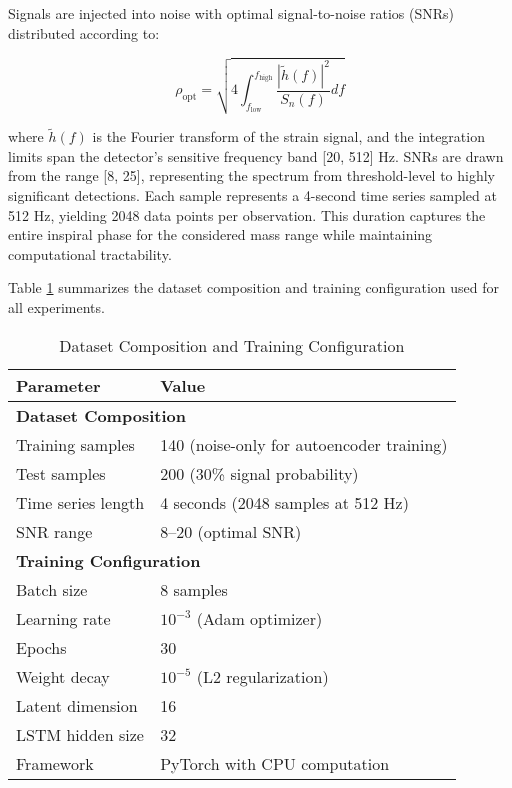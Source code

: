 \documentclass{iopjournal}
\begin{document}
Signals are injected into noise with optimal signal-to-noise ratios (SNRs) distributed according to:

\begin{equation}
\rho_{\text{opt}} = \sqrt{4 \int_{f_{\text{low}}}^{f_{\text{high}}} \frac{|\tilde{h}(f)|^2}{S_n(f)} df}
\end{equation}

where $\tilde{h}(f)$ is the Fourier transform of the strain signal, and the integration limits span the detector's sensitive frequency band [20, 512] Hz. SNRs are drawn from the range [8, 25], representing the spectrum from threshold-level to highly significant detections. Each sample represents a 4-second time series sampled at 512 Hz, yielding 2048 data points per observation. This duration captures the entire inspiral phase for the considered mass range while maintaining computational tractability.

Table \ref{tab:dataset} summarizes the dataset composition and training configuration used for all experiments.

\begin{table}[htbp]
\centering
\caption{Dataset Composition and Training Configuration}
\label{tab:dataset}
\begin{tabular}{ll}
\hline
\textbf{Parameter} & \textbf{Value} \\
\hline
\multicolumn{2}{l}{\textbf{Dataset Composition}} \\
Training samples & 140 (noise-only for autoencoder training) \\
Test samples & 200 (30\% signal probability) \\
Time series length & 4 seconds (2048 samples at 512 Hz) \\
SNR range & 8--20 (optimal SNR) \\
\hline
\multicolumn{2}{l}{\textbf{Training Configuration}} \\
Batch size & 8 samples \\
Learning rate & $10^{-3}$ (Adam optimizer) \\
Epochs & 30 \\
Weight decay & $10^{-5}$ (L2 regularization) \\
Latent dimension & 16 \\
LSTM hidden size & 32 \\
Framework & PyTorch with CPU computation \\
\hline
\end{tabular}
\end{table}
\end{document}
